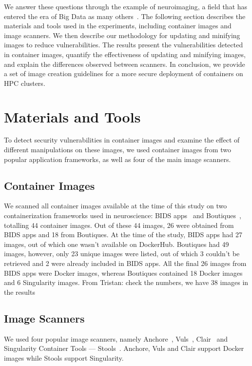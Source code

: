 \documentclass[a4paper,num-refs]{oup-contemporary}
\newcommand{\tristan}[1]{\color{blue}From Tristan: #1\color{black}}
\begin{document}
We answer these questions through the example of neuroimaging, a field that
has entered the era of Big Data as many others~\cite{van2014human}. The
following section describes the materials and tools used in the
experiments, including container images and image scanners. We then
describe our methodology for updating and minifying images to reduce
vulnerabilities. The results present the vulnerabilities detected in container
images, quantify the effectiveness of updating and minifying images, and
explain the differences observed between scanners. In conclusion, we
provide a set of image creation guidelines for a more secure deployment of
containers on HPC clusters.

\section{Materials and Tools}

To detect security vulnerabilities
in container images and examine the effect of different
manipulations on these images, we used container
images from two popular application frameworks, as well as
four of the main image scanners.

\subsection{Container Images}

We scanned all container images available at the time of this study on two containerization frameworks
used in neuroscience: BIDS
apps~\cite{gorgolewski2017bids} and Boutiques~\cite{glatard2018boutiques},
totalling
44 container images.
Out of these 44 images, 26 were obtained from BIDS apps 
and 18 from Boutiques. At the time of the study, BIDS apps had 27 images,
out of which one wasn't available on DockerHub. Boutiques had 49 images,
however, only 23 unique images were listed, out of which 3 couldn't be retrieved and 2
were already included in BIDS apps. All the final 26 images
from BIDS apps were Docker images, whereas Boutiques contained 18 Docker images
and 6 Singularity images. \tristan{check the numbers, we have 38 images in the results}

\subsection{Image Scanners}

We used four popular image scanners, namely Anchore~\cite{github_2019},
Vuls~\cite{future-architect_2019}, Clair~\cite{arminc_2019} and
Singularity Container Tools --- Stools~\cite{stools}. Anchore, Vuls and Clair support Docker
images while Stools support Singularity. 
\end{document}
